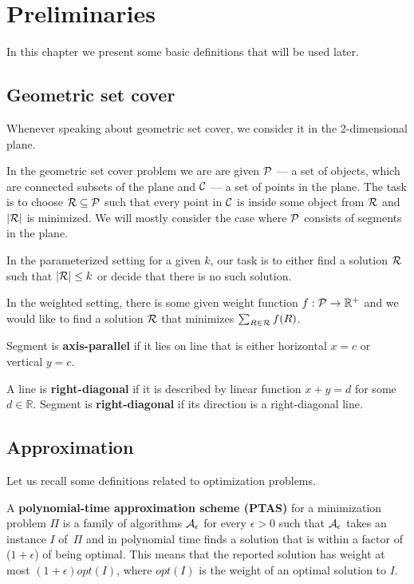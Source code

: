 \chapter{Preliminaries}

In this chapter we present some basic definitions that
will be used later.

\section{Geometric set cover}
\label{section:def:geometric__set_cover}
Whenever speaking about geometric set cover,
we consider it in the 2-dimensional plane.

In the geometric set cover problem we are are given
$\mathcal{P}$ --- a set of objects, which are connected
subsets of the plane and $\mathcal{C}$ --- a set of points in the plane.
The task is to choose $\mathcal{R} \subseteq \mathcal{P}$ such that
every point in $\mathcal{C}$ is inside some object from $\mathcal{R}$
and $|\mathcal{R}|$ is minimized. We will mostly consider the case where
$\mathcal{P}$ consists of segments in the plane. 

In the parameterized setting for a given $k$,
our task is to either find a solution $\mathcal{R}$ such that $|\mathcal{R}| \le k$
or decide that there is no such solution.

In the weighted setting, there is some given weight function
$f : \mathcal{P} \rightarrow \mathbb{R^+}$
and we would like to find a solution $\mathcal{R}$
that minimizes $\sum_{R \in \mathcal{R}} f(R)$.

\begin{defi}
Segment is \textbf{axis-parallel} if it lies on line that is
either horizontal $x = c$ or vertical $y = c$.
\end{defi}

\begin{defi}
	A line is \textbf{right-diagonal} if it is
	described by linear function $x + y = d$ for some $d \in \mathbb{R}$.
	Segment is \textbf{right-diagonal} if its
	direction is a right-diagonal line.
\end{defi}

\section{Approximation}

Let us recall some definitions related to optimization problems.

\begin{defi}
A \textbf{polynomial-time approximation scheme (PTAS)}
for a minimization problem $\Pi$
is a family of algorithms $\cal{A}_\epsilon$ for
every $\epsilon > 0$
such that $\cal{A}_\epsilon$ takes an instance $I$ of~$\Pi$
and in polynomial time
finds a solution that is within a factor
of ($1+\epsilon$) of being optimal.
This means that the reported solution has weight at most
$(1+\epsilon)opt(I)$, where $opt(I)$ is the weight
of an optimal solution to $I$.
\end{defi}

